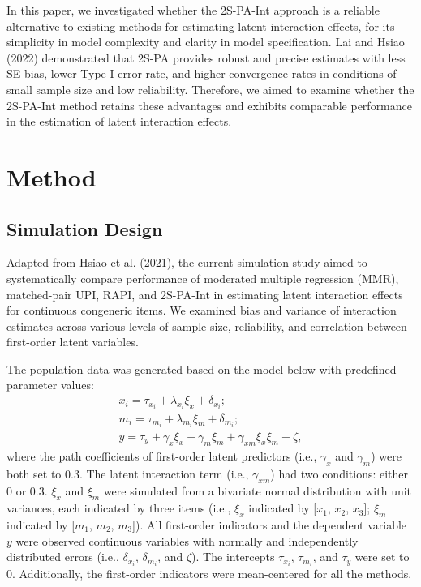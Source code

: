 \documentclass[
  man]{apa6}
\begin{document}
In this paper, we investigated whether the 2S-PA-Int approach is a reliable alternative to existing methods for estimating latent interaction effects, for its simplicity in model complexity and clarity in model specification. Lai and Hsiao (2022) demonstrated that 2S-PA provides robust and precise estimates with less SE bias, lower Type I error rate, and higher convergence rates in conditions of small sample size and low reliability. Therefore, we aimed to examine whether the 2S-PA-Int method retains these advantages and exhibits comparable performance in the estimation of latent interaction effects.

\section{Method}\label{method}

\subsection{Simulation Design}\label{simulation-design}

Adapted from Hsiao et al. (2021), the current simulation study aimed to systematically compare performance of moderated multiple regression (MMR), matched-pair UPI, RAPI, and 2S-PA-Int in estimating latent interaction effects for continuous congeneric items. We examined bias and variance of interaction estimates across various levels of sample size, reliability, and correlation between first-order latent variables.

The population data was generated based on the model below with predefined parameter values:
\begin{equation}
\begin{gathered}
x_{i} =  \tau_{x_{i}} + \lambda_{x_{i}}\xi_{x} + \delta_{x_{i}};\\
m_{i} =  \tau_{m_{i}} + \lambda_{m_{i}}\xi_{m} + \delta_{m_{i}};\\
y =  \tau_{y} + \gamma_{x}\xi_{x} + \gamma_{m}\xi_{m} + \gamma_{xm}\xi_{x}\xi_{m} + \zeta,
\end{gathered}
\end{equation}
where the path coefficients of first-order latent predictors (i.e., \(\gamma_{x}\) and \(\gamma_{m}\)) were both set to 0.3. The latent interaction term (i.e., \(\gamma_{xm}\)) had two conditions: either 0 or 0.3. \(\xi_{x}\) and \(\xi_{m}\) were simulated from a bivariate normal distribution with unit variances, each indicated by three items (i.e., \(\xi_{x}\) indicated by {[}\(x_{1}\), \(x_{2}\), \(x_{3}\){]}; \(\xi_{m}\) indicated by {[}\(m_{1}\), \(m_{2}\), \(m_{3}\){]}). All first-order indicators and the dependent variable \(y\) were observed continuous variables with normally and independently distributed errors (i.e., \(\delta_{x_{i}}\), \(\delta_{m_{i}}\), and \(\zeta\)). The intercepts \(\tau_{x_{i}}\), \(\tau_{m_{i}}\), and \(\tau_{y}\) were set to 0. Additionally, the first-order indicators were mean-centered for all the methods.
\end{document}
